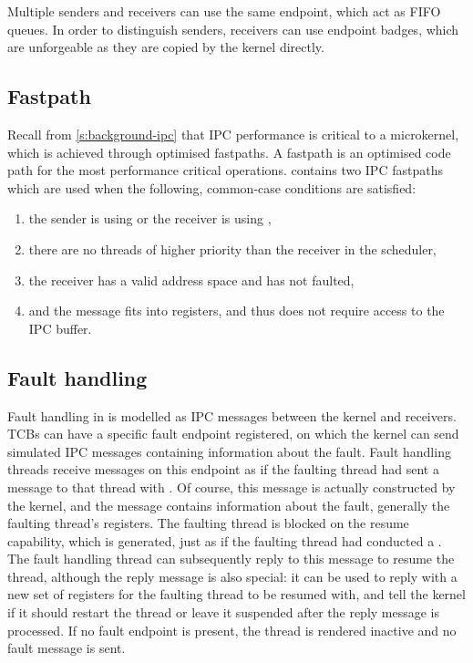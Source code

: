 Multiple senders and receivers can use the same endpoint, which act as \gls{FIFO}
queues. In order to distinguish senders, receivers can use endpoint badges, which are unforgeable as
they are copied by the kernel directly. 

\subsection{Fastpath}
\label{sec:sel4-fastpath}

Recall from \cref{s:background-ipc} that \gls{IPC} performance is critical to a microkernel, which
is achieved through optimised fastpaths. A fastpath is an optimised code path for the most
performance critical operations. \selfour
contains two \gls{IPC} fastpaths which are used when the following, common-case conditions are satisfied:

\begin{enumerate}
    \item the sender is using \call or the receiver is using \replyrecv,
    \item there are no threads of higher priority than the receiver in the scheduler,
    \item the receiver has a valid address space and has not faulted,
    \item and the message fits into registers, and thus does not require access to the IPC buffer.
\end{enumerate}

\subsection{Fault handling}
\label{api:faults}

Fault handling in \selfour is modelled as IPC messages between the kernel and receivers. 
\glspl{TCB} can have a specific fault endpoint registered, on which the kernel can send simulated
\gls{IPC} messages containing information about the fault. Fault handling threads receive messages
on this endpoint as if the faulting thread had sent a message to that thread with \call. Of
course, this message is actually constructed by the kernel, and the message contains information
about the fault, generally the faulting thread's registers. The faulting thread is blocked on the
resume capability, which is generated, just as if the faulting thread had conducted a \call.
The fault handling thread can subsequently reply to this message to
resume the thread, although the reply message is also special: it can be used to reply with a new
set of registers for the faulting thread to be resumed with, and tell the kernel if it should
restart the thread or leave it suspended after the reply message is processed.
If no fault endpoint is present, the
thread is rendered inactive and no fault message is sent. 

